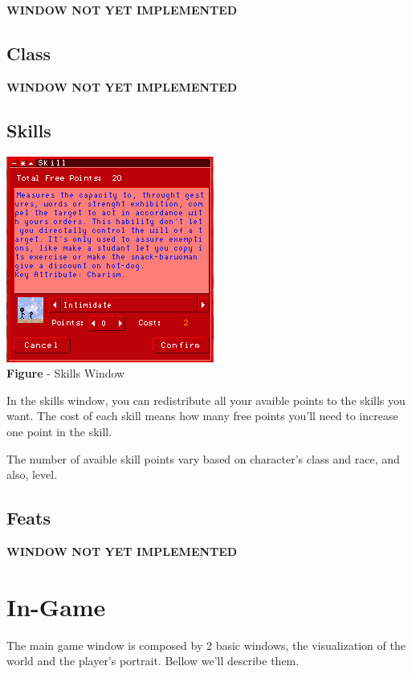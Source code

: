 \documentclass[ letterpaper,12pt]{article}
\begin{document}
{\bf WINDOW NOT YET IMPLEMENTED}

\subsection{Class}

{\bf WINDOW NOT YET IMPLEMENTED}

\subsection{Skills}

\begin{center}
  \includegraphics{skillWindow.png}
\\{\bf Figure} - Skills Window
\end{center}

In the skills window, you can redistribute all your avaible points to the skills you want. The cost of each skill means how many free points you'll need to increase one point in the skill.

The number of avaible skill points vary based on character's class and race, and also, level.

\subsection{Feats}

{\bf WINDOW NOT YET IMPLEMENTED}

\section{In-Game}

The main game window is composed by 2 basic windows, the visualization of the world and the player's portrait. Bellow we'll describe them.
\end{document}
